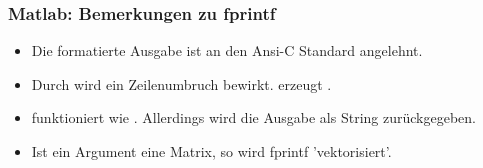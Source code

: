 \documentclass[hyperref={xetex}]{beamer}
\begin{document}
%
%
\begin{frame}[fragile]\frametitle{Matlab: Bemerkungen zu fprintf}
\begin{itemize} 
\item Die formatierte Ausgabe ist an den Ansi-C Standard angelehnt.
\item Durch  wird ein Zeilenumbruch bewirkt.  erzeugt
  \mcode{\%}.
 \item {} funktioniert wie . Allerdings wird
  die Ausgabe als String zurückgegeben. 
\item Ist ein Argument eine Matrix, so wird fprintf 'vektorisiert'.
\end{itemize}
\end{frame}
\end{document}

